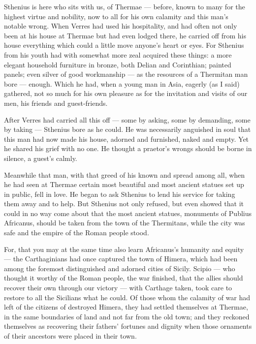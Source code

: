  Sthenius is here who sits with us, of Thermae --- before, known to many for the highest virtue and nobility, now to all for his own calamity and this man's notable wrong. When Verres had used his hospitality, and had often not only been at his house at Thermae but had even lodged there, he carried off from his house everything which could a little move anyone's heart or eyes. For Sthenius from his youth had with somewhat more zeal acquired these things: a more elegant household furniture in bronze, both Delian and Corinthian; painted panels; even silver of good workmanship --- as the resources of a Thermitan man bore --- enough. Which he had, when a young man in Asia, eagerly (as I said) gathered, not so much for his own pleasure as for the invitation and visits of our men, his friends and guest-friends.

 After Verres had carried all this off --- some by asking, some by demanding, some by taking --- Sthenius bore as he could. He was necessarily anguished in soul that this man had now made his house, adorned and furnished, naked and empty. Yet he shared his grief with no one. He thought a praetor's wrongs should be borne in silence, a guest's calmly.

 Meanwhile that man, with that greed of his known and spread among all, when he had seen at Thermae certain most beautiful and most ancient statues set up in public, fell in love. He began to ask Sthenius to lend his service for taking them away and to help. But Sthenius not only refused, but even showed that it could in no way come about that the most ancient statues, monuments of Publius Africanus, should be taken from the town of the Thermitans, while the city was safe and the empire of the Roman people stood.

 For, that you may at the same time also learn Africanus's humanity and equity --- the Carthaginians had once captured the town of Himera, which had been among the foremost distinguished and adorned cities of Sicily. Scipio --- who thought it worthy of the Roman people, the war finished, that the allies should recover their own through our victory --- with Carthage taken, took care to restore to all the Sicilians what he could. Of those whom the calamity of war had left of the citizens of destroyed Himera, they had settled themselves at Thermae, in the same boundaries of land and not far from the old town; and they reckoned themselves as recovering their fathers' fortunes and dignity when those ornaments of their ancestors were placed in their town.

